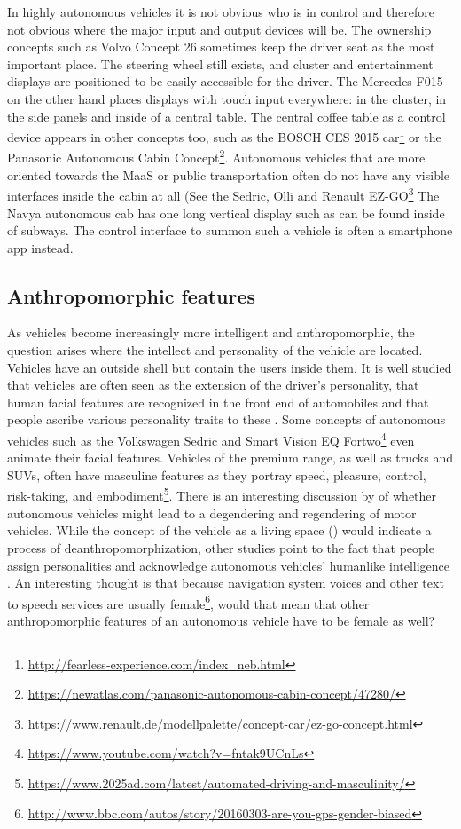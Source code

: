In highly autonomous vehicles it is not obvious who is in control and therefore not obvious where the major input and output devices will be. The ownership concepts such as Volvo Concept 26 sometimes keep the driver seat as the most important place. The steering wheel still exists, and cluster and entertainment displays are positioned to be easily accessible for the driver. The Mercedes F015 on the other hand places displays with touch input everywhere: in the cluster, in the side panels and inside of a central table. The central coffee table as a control device appears in other concepts too, such as the BOSCH CES 2015 car\footnote{\url{http://fearless-experience.com/index_neb.html}} or the Panasonic Autonomous Cabin Concept\footnote{\url{https://newatlas.com/panasonic-autonomous-cabin-concept/47280/}}. Autonomous vehicles that are more oriented towards the MaaS or public transportation often do not have any visible interfaces inside the cabin at all (See the Sedric, Olli and Renault EZ-GO\footnote{\url{https://www.renault.de/modellpalette/concept-car/ez-go-concept.html}} The Navya autonomous cab has one long vertical display such as can be found inside of subways. The control interface to summon such a vehicle is often a smartphone app instead. 

\subsection{Anthropomorphic features}
As vehicles become increasingly more intelligent and anthropomorphic, the question arises where the intellect and personality of the vehicle are located. Vehicles have an outside shell but contain the users inside them. It is well studied that vehicles are often seen as the extension of the driver's personality, that human facial features are recognized in the front end of automobiles and that people ascribe various personality traits to these \citep[see][]{Windhager2008FaceDesigns}. Some concepts of autonomous vehicles such as the Volkswagen Sedric and Smart Vision EQ Fortwo\footnote{\url{https://www.youtube.com/watch?v=fntak9UCnLs}} even animate their facial features. Vehicles of the premium range, as well as trucks and SUVs, often have masculine features as they portray speed, pleasure, control, risk-taking, and embodiment\footnote{\url{https://www.2025ad.com/latest/automated-driving-and-masculinity/}}. There is an interesting discussion by \citet{Balkmar2018} of whether autonomous vehicles might lead to a degendering and regendering of motor vehicles.
While the concept of the vehicle as a living space (\emph{}) would indicate a process of deanthropomorphization, other studies point to the fact that people assign personalities and acknowledge autonomous vehicles’ humanlike intelligence \citep[see][]{Waytz2014}. An interesting thought is that because navigation system voices and other text to speech services are usually female\footnote{\url{http://www.bbc.com/autos/story/20160303-are-you-gps-gender-biased}}, would that mean that other anthropomorphic features of an autonomous vehicle have to be female as well? 

